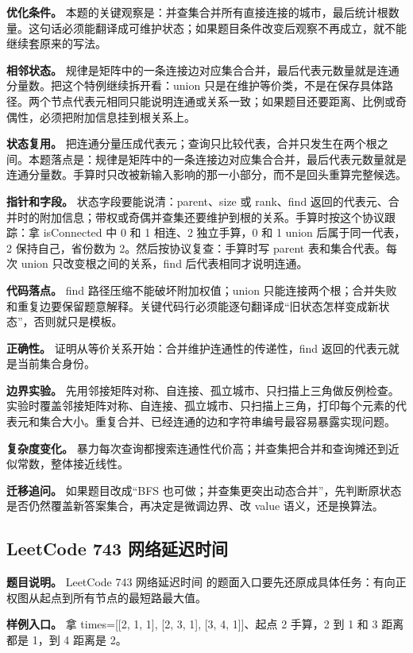 \textbf{优化条件。} 本题的关键观察是：并查集合并所有直接连接的城市，最后统计根数量。这句话必须能翻译成可维护状态；如果题目条件改变后观察不再成立，就不能继续套原来的写法。

\textbf{相邻状态。} 规律是矩阵中的一条连接边对应集合合并，最后代表元数量就是连通分量数。把这个特例继续拆开看：union 只是在维护等价类，不是在保存具体路径。两个节点代表元相同只能说明连通或关系一致；如果题目还要距离、比例或奇偶性，必须把附加信息挂到根关系上。

\textbf{状态复用。} 把连通分量压成代表元；查询只比较代表，合并只发生在两个根之间。本题落点是：规律是矩阵中的一条连接边对应集合合并，最后代表元数量就是连通分量数。手算时只改被新输入影响的那一小部分，而不是回头重算完整候选。

\textbf{指针和字段。} 状态字段要能说清：parent、size 或 rank、find 返回的代表元、合并时的附加信息；带权或奇偶并查集还要维护到根的关系。手算时按这个协议跟踪：拿 isConnected 中 0 和 1 相连、2 独立手算，0 和 1 union 后属于同一代表，2 保持自己，省份数为 2。然后按协议复查：手算时写 parent 表和集合代表。每次 union 只改变根之间的关系，find 后代表相同才说明连通。

\textbf{代码落点。} find 路径压缩不能破坏附加权值；union 只能连接两个根；合并失败和重复边要保留题意解释。关键代码行必须能逐句翻译成“旧状态怎样变成新状态”，否则就只是模板。

\textbf{正确性。} 证明从等价关系开始：合并维护连通性的传递性，find 返回的代表元就是当前集合身份。

\textbf{边界实验。} 先用邻接矩阵对称、自连接、孤立城市、只扫描上三角做反例检查。实验时覆盖邻接矩阵对称、自连接、孤立城市、只扫描上三角，打印每个元素的代表元和集合大小。重复合并、已经连通的边和字符串编号最容易暴露实现问题。

\textbf{复杂度变化。} 暴力每次查询都搜索连通性代价高；并查集把合并和查询摊还到近似常数，整体接近线性。

\textbf{迁移追问。} 如果题目改成“BFS 也可做；并查集更突出动态合并”，先判断原状态是否仍然覆盖新答案集合，再决定是微调边界、改 value 语义，还是换算法。

\subsection{LeetCode 743 网络延迟时间}

\textbf{题目说明。} LeetCode 743 网络延迟时间 的题面入口要先还原成具体任务：有向正权图从起点到所有节点的最短路最大值。

\textbf{样例入口。} 拿 times=[[2, 1, 1], [2, 3, 1], [3, 4, 1]]、起点 2 手算，2 到 1 和 3 距离都是 1，到 4 距离是 2。

